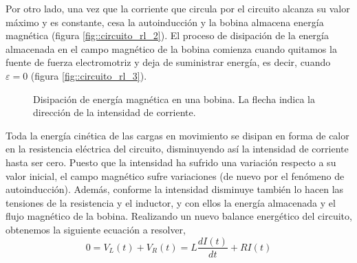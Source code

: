 \documentclass[../main.tex]{subfiles}
\begin{document}
    
Por otro lado, una vez que la corriente que circula por el circuito alcanza su valor máximo y es constante, cesa la autoinducción y la bobina almacena energía magnética (figura \ref{fig::circuito_rl_2}). El proceso de disipación de la energía almacenada en el campo magnético de la bobina comienza cuando quitamos la fuente de fuerza electromotriz y deja de suministrar energía, es decir, cuando $\varepsilon = 0$ (figura \ref{fig::circuito_rl_3}). \\
    

 \begin{figure}[!h]
    \centering
    \caption{Disipación de energía magnética en una bobina. La flecha indica la dirección de la intensidad de corriente.}
    \label{fig::carga_bobina}
\end{figure}

Toda la energía cinética de las cargas en movimiento se disipan en forma de calor en la resistencia eléctrica del circuito, disminuyendo así la intensidad de corriente hasta ser cero. Puesto que la intensidad ha sufrido una variación respecto a su valor inicial, el campo magnético sufre variaciones (de nuevo por el fenómeno de autoinducción). Además, conforme la intensidad disminuye también lo hacen las tensiones de la resistencia y el inductor, y con ellos la energía almacenada y el flujo magnético de la bobina. Realizando un nuevo balance energético del circuito, obtenemos la siguiente ecuación a resolver, 
\begin{equation}
    \label{eqq::descarga_bobina}
    0 = V_L(t) + V_R(t) = L \frac{d I(t)}{d t} + R I(t)
\end{equation}
\end{document}
